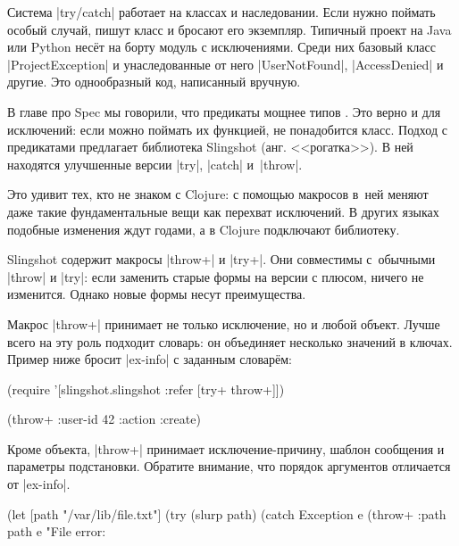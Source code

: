 Система \spverb|try/catch| работает на классах и наследовании. Если нужно
поймать особый случай, пишут класс и бросают его экземпляр. Типичный проект на
Java или Python нес\"{е}т на борту модуль с исключениями. Среди них базовый класс
\spverb|ProjectException| и унаследованные от него \spverb|UserNotFound|,
\spverb|AccessDenied| и другие. Это однообразный код, написанный вручную.


В главе про Spec мы говорили, что предикаты мощнее типов
. Это верно и для исключений: если можно поймать их
функцией, не понадобится класс. Подход с предикатами предлагает библиотека
Slingshot (анг. <<рогатка>>). В
ней находятся улучшенные версии \spverb|try|, \spverb|catch| и~\spverb|throw|.


Это удивит тех, кто не знаком с Clojure: с помощью макросов в~ней меняют даже
такие фундаментальные вещи как перехват исключений. В других языках подобные
изменения ждут годами, а в Clojure подключают библиотеку.


Slingshot содержит макросы \spverb|throw+| и \spverb|try+|. Они совместимы
с~обычными \spverb|throw| и \spverb|try|: если заменить старые формы на версии с
плюсом, ничего не изменится. Однако новые формы несут преимущества.

Макрос \spverb|throw+| принимает не только исключение, но и любой объект. Лучше
всего на эту роль подходит словарь: он объединяет несколько значений в
ключах. Пример ниже бросит \spverb|ex-info| с заданным словар\"{е}м:

\begin{english}
  \begin{clojure}
(require '[slingshot.slingshot :refer [try+ throw+]])

(throw+ {:user-id 42 :action :create})
  \end{clojure}
\end{english}

Кроме объекта, \spverb|throw+| принимает исключение-причину, шаблон сообщения и
параметры подстановки. Обратите внимание, что порядок аргументов отличается от
\spverb|ex-info|.

\begin{english}
  \begin{clojure}
(let [path "/var/lib/file.txt"]
  (try
    (slurp path)
    (catch Exception e
      (throw+ {:path path} e "File error: %
  \end{clojure}
\end{english}

